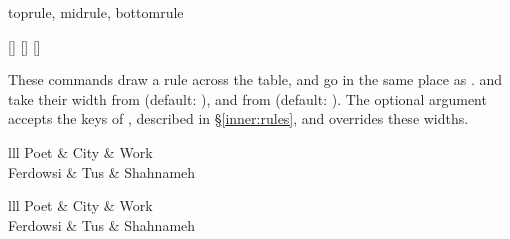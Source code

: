 \begin{codedescribe}[
        code,
        new=2021L
    ]{toprule, midrule, bottomrule}
    \begin{codesyntax}
        []
        []
        []
    \end{codesyntax}
    These commands draw a rule across the table, and go in the same place as .  and  take their width from \tsobj[code]{\heavyrulewidth} (default: \val{.08em}), and  from \tsobj[code]{\lightrulewidth} (default: \val{.05em}). The optional argument accepts the keys of , described in \S\ref{inner:rules}, and overrides these widths.

    \begin{codestore}[st=lib:booktabs:rules]
        \begin{tblr}{lll}
            \toprule
            Poet     & City & Work      \\
            \midrule
            Ferdowsi & Tus  & Shahnameh \\
            \bottomrule
        \end{tblr}\quad
        \begin{tblr}{lll}
            \toprule[2pt, red]
            Poet     & City & Work      \\
            \midrule[blue]
            Ferdowsi & Tus  & Shahnameh \\
            \bottomrule[2pt, red]
        \end{tblr}\end{codestore}
    \begin{center}
    \end{center}
\end{codedescribe}

